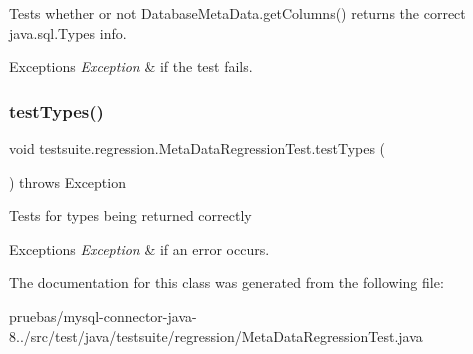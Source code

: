 Tests whether or not Database\+Meta\+Data.\+get\+Columns() returns the correct java.\+sql.\+Types info.


\begin{DoxyExceptions}{Exceptions}
{\em Exception} & if the test fails. \\
\hline
\end{DoxyExceptions}
\mbox{\label{classtestsuite_1_1regression_1_1_meta_data_regression_test_a538c5b4ba85f2b4160bcaa4885f13142}} 
\subsubsection{\texorpdfstring{test\+Types()}{testTypes()}}
{\footnotesize\ttfamily void testsuite.\+regression.\+Meta\+Data\+Regression\+Test.\+test\+Types (\begin{DoxyParamCaption}{ }\end{DoxyParamCaption}) throws Exception}

Tests for types being returned correctly


\begin{DoxyExceptions}{Exceptions}
{\em Exception} & if an error occurs. \\
\hline
\end{DoxyExceptions}


The documentation for this class was generated from the following file\+:\begin{DoxyCompactItemize}
\item 
pruebas/mysql-\/connector-\/java-\/8../src/test/java/testsuite/regression/Meta\+Data\+Regression\+Test.\+java\end{DoxyCompactItemize}
